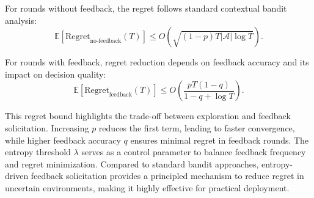 For rounds without feedback, the regret follows standard contextual bandit analysis:
\begin{equation}
\mathbb{E}[\text{Regret}_{\text{no-feedback}}(T)] \leq O\left(\sqrt{(1 - p)T |\mathcal{A}| \log T}\right).
\end{equation}

For rounds with feedback, regret reduction depends on feedback accuracy and its impact on decision quality:
\begin{equation}
\mathbb{E}[\text{Regret}_{\text{feedback}}(T)] \leq O\left( \frac{p T (1 - q)}{1 - q + \log T} \right).
\end{equation}


This regret bound highlights the trade-off between exploration and feedback solicitation. Increasing $p$ reduces the first term, leading to faster convergence, while higher feedback accuracy $q$ ensures minimal regret in feedback rounds. The entropy threshold $\lambda$ serves as a control parameter to balance feedback frequency and regret minimization. Compared to standard bandit approaches, entropy-driven feedback solicitation provides a principled mechanism to reduce regret in uncertain environments, making it highly effective for practical deployment.
